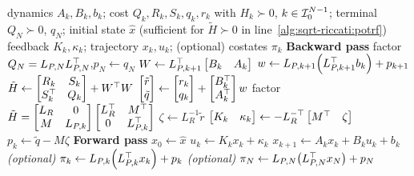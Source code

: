 \begin{algorithm}[t]
\caption{Square-root Riccati recursion --- Cholesky form}
\label{alg:sqrt-riccati}
\begin{algorithmic}[1]
\Require dynamics $A_k, B_k, b_k$; cost $Q_k, R_k, S_k, q_k, r_k$ with $H_k \succ 0$, $k \in \mathcal{I}_{0}^{N-1}$;
         terminal $Q_N \succ 0$, $q_N$; initial state $\hat{x}$
         (sufficient for $\tilde{H} \succ 0$ in line~\ref{alg:sqrt-riccati:potrf})
\Ensure feedback $K_k, \kappa_k$; trajectory $x_k, u_k$; (optional) costates $\pi_k$
\Statex \textbf{Backward pass}
\State factor $Q_N = L_{P,N} L_{P,N}^\top$,\quad $p_N \gets q_N$
\State $W \gets L_{P,k+1}^\top \begin{bmatrix} B_k & A_k \end{bmatrix}$
\State $w \gets L_{P,k+1}\!\left(L_{P,k+1}^\top b_k\right) + p_{k+1}$
\State $\tilde{H} \gets
\begin{bmatrix} R_k & S_k \\ S_k^\top & Q_k \end{bmatrix} + W^\top W$
\State $\begin{bmatrix} \tilde r \\ \tilde q \end{bmatrix} \gets
\begin{bmatrix} r_k \\ q_k \end{bmatrix}
+ \begin{bmatrix} B_k^\top \\ A_k^\top \end{bmatrix} w$
\State factor $\tilde{H} =
\begin{bmatrix} L_R & 0 \\ M & L_{P,k} \end{bmatrix}
\begin{bmatrix} L_R^\top & M^\top \\ 0 & L_{P,k}^\top \end{bmatrix}$
\label{alg:sqrt-riccati:potrf}
\State $\zeta \gets L_R^{-1}\tilde r$
\State $\begin{bmatrix} K_k & \kappa_k \end{bmatrix} \gets
-L_R^{-\top} \begin{bmatrix} M^\top & \zeta \end{bmatrix}$
\State $p_k \gets \tilde q - M\zeta$
\EndFor
\Statex \textbf{Forward pass}
\State $x_0 \gets \hat{x}$
\State $u_k \gets K_k x_k + \kappa_k$
\State $x_{k+1} \gets A_k x_k + B_k u_k + b_k$
\State \textit{(optional)}\; $\pi_k \gets L_{P,k}\!\left(L_{P,k}^\top x_k\right) + p_k$
\EndFor
\State \textit{(optional)}\; $\pi_N \gets L_{P,N}\!\left(L_{P,N}^\top x_N\right) + p_N$
\end{algorithmic}
\end{algorithm}

